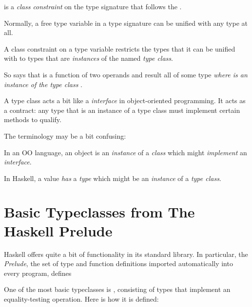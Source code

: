 \begin{notelist}
    \item {} is a \textit{class constraint} on the type signature that
          follows the \code{=>}. 

    \item Normally, a free type variable in a type signature can be unified with any type at all.
    
    \item A class constraint on a type variable restricts the types that it can be unified with
          to types that are \textit{instances} of the named \textit{type class}.

    \item So  says that \code{(+)} is a function of
          two operands and result all of some type  \textit{where  is
          an instance of the type class }.

    \item A type class acts a bit like a \textit{interface} in object-oriented programming.
          It acts as a contract: any type that is an instance of a type class must implement 
          certain methods to qualify.

    \item The terminology may be a bit confusing:
    \begin{notelist}
        \item In an OO language, an object is an \textit{instance} of a \textit{class} which
              might \textit{implement} an \textit{interface}.
        \item In Haskell, a value \textit{has} a \textit{type} which might be an \textit{instance}
              of a \textit{type class}.
    \end{notelist}
\end{notelist}

\section{Basic Typeclasses from The Haskell Prelude}

Haskell offers quite a bit of functionality in its standard library. In particular, the \textit{Prelude},
the set of type and function definitions imported automatically into every program, defines 

One of the most basic typeclasses is , consisting of types that implement an equality-testing
operation. Here is how it is defined:

